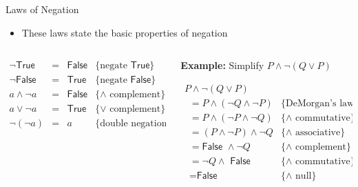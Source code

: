 \documentclass[11pt,t,pdf,xcolor=svgnames,aspectratio=169]{beamer}
\providecommand{\tightlist}{%
  \setlength{\itemsep}{5pt}\setlength{\parskip}{0pt}}
\begin{document}
\begin{frame}{Laws of Negation}
\protect\hypertarget{laws-of-negation}{}
\begin{itemize}
\tightlist
\item
  These laws state the basic properties of negation
\end{itemize}

\begin{columns}[T]
\begin{column}{0.48\textwidth}
\begin{center}
$\begin{array}{rcll}
\lnot\textsf{True}  & = & \textsf{False} & \{\textrm{negate}\,\,\textsf{True}\} \\
\lnot\textsf{False} & = & \textsf{True}  & \{\textrm{negate}\,\,\textsf{False}\} \\
a \land \lnot a     & = & \textsf{False} & \{\land\,\,\textrm{complement}\} \\
a \lor \lnot a      & = & \textsf{True}  & \{\lor\,\,\textrm{complement}\} \\
\lnot (\lnot a)     & = & a              & \{\textrm{double negation}\}
\end{array}$
\end{center}
\end{column}

\begin{column}{0.48\textwidth}
\textbf{Example:} Simplify \(P \land \lnot (Q \lor P)\)

\(\begin{array}{lr} P \land \lnot (Q \lor P) & \\ \,\,\,= P \land (\lnot Q \land \lnot P) & \{\textrm{DeMorgan's law}\} \\ \,\,\,= P \land (\lnot P \land \lnot Q) & \{\land\,\, \textrm{commutative}\} \\ \,\,\,= (P \land \lnot P) \land \lnot Q & \{\land\,\, \textrm{associative}\} \\ \,\,\,= \textsf{False}\,\, \land \lnot Q & \{\land\,\, \textrm{complement}\} \\ \,\,\,= \lnot Q \land\,\, \textsf{False} & \{\land\,\, \textrm{commutative}\} \\ \,\,\,= \textsf{False} & \{\land\,\, \textrm{null}\} \end{array}\)
\end{column}
\end{columns}
\end{frame}
\end{document}
